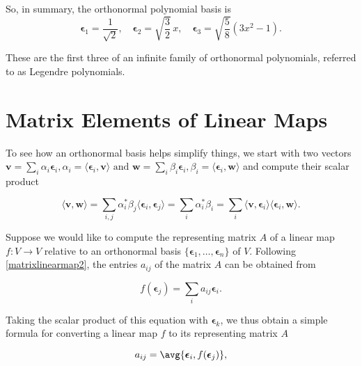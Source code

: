 \documentclass[a4paper,12pt]{report}
\begin{document}
{So, in summary, the orthonormal polynomial basis is
\begin{equation}
\boldsymbol{\epsilon}_1 = \frac{1}{\sqrt{2}}, \quad \boldsymbol{\epsilon}_2 = \sqrt{\frac{3}{2}} \, x, \quad \boldsymbol{\epsilon}_3 = \sqrt{\frac{5}{8}} (3x^2 - 1).
\end{equation}

These are the first three of an infinite family of orthonormal polynomials, referred to as Legendre polynomials.} 

\section{Matrix Elements of Linear Maps}

To see how an orthonormal basis helps simplify things, we start with two vectors \(\mathbf{v} = \sum_i \alpha_i \boldsymbol{\epsilon}_i, \alpha_i = \langle \boldsymbol{\epsilon}_i, \mathbf{v} \rangle \text { and } \mathbf{w} = \sum_i \beta_i \boldsymbol{\epsilon}_i, \beta_i = \langle \boldsymbol{\epsilon}_i, \mathbf{w} \rangle\) and compute their scalar product

\begin{equation}
    \langle \mathbf{v}, \mathbf{w} \rangle = \sum_{i,j} \alpha_i^* \beta_j \langle \boldsymbol{\epsilon}_i, \boldsymbol{\epsilon}_j \rangle = \sum_i \alpha_i^* \beta_i = \sum_i \langle \mathbf{v}, \boldsymbol{\epsilon}_i \rangle \langle \boldsymbol{\epsilon}_i, \mathbf{w} \rangle.
\end{equation}

Suppose we would like to compute the representing matrix $A$ of a linear map $f : V \to V$ relative to an orthonormal basis $\{ \boldsymbol{\epsilon}_1, \ldots, \boldsymbol{\epsilon}_n \}$ of $V$. Following \cref{matrixlinearmap2}, the entries $a_{ij}$ of the matrix $A$ can be obtained from

\begin{equation} \label{matricesentries} 
    f(\boldsymbol{\epsilon}_j) = \sum_i a_{ij} \boldsymbol{\epsilon}_i.
\end{equation}

Taking the scalar product of this equation with \(\boldsymbol{\epsilon } _{k} \), we thus obtain a simple formula for converting a linear map \(f\) to its representing matrix \(A\)

\begin{equation}
    a_{ij}= \avg{\boldsymbol{\epsilon } _{i}, f(\boldsymbol{\epsilon }_{j}  ) },
\end{equation}
\end{document}
